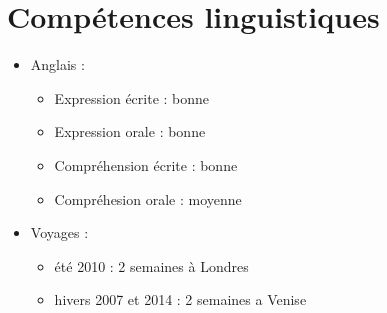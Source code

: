 \documentclass[a4paper]{article}
\begin{document}
\section*{Compétences linguistiques}

\begin{itemize}
\item Anglais :
\begin{itemize}
\item Expression écrite : bonne
\item Expression orale : bonne
\item Compréhension écrite : bonne
\item Compréhesion orale : moyenne
\end{itemize}
\item Voyages :
\begin{itemize}
\item été 2010 : 2 semaines à Londres
\item hivers 2007 et 2014 : 2 semaines a Venise
\end{itemize}
\end{itemize}
\end{document}
